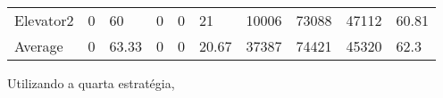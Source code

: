 \documentclass[a4paper]{article}
\begin{document}
\begin{table}[h]
\begin{tabular}{@{}llllllllll@{}}
Elevator2 & 0        & 60            & 0           & 0                                                               & 21                                                                  & 10006                                                         & 73088                                                 & 47112                                                   & 60.81         \\
Average   & 0     & 63.33         & 0        & 0                                                               & 20.67                                                               & 37387                                                         & 74421                                                 &  45320                                                  & 62.3         \\ \bottomrule
\end{tabular}
\end{table}

Utilizando a quarta estratégia,
\end{document}
